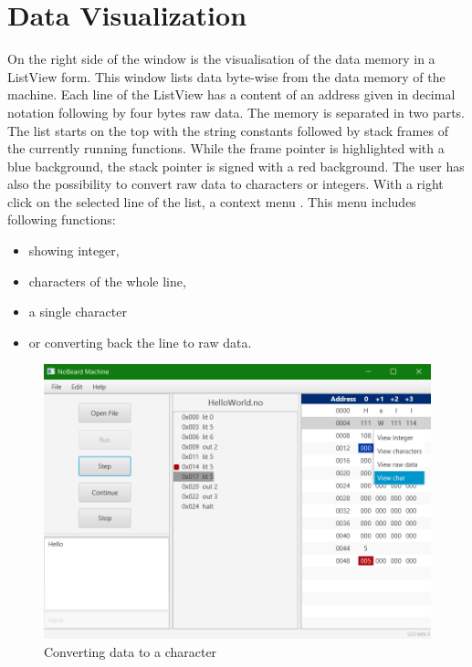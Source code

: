 \section{Data Visualization}
On the right side of the window is the visualisation of the data memory in a ListView form. This window lists data byte-wise from the data memory of the machine. Each line of the ListView has a content of an address given in decimal notation  following by four bytes  raw data. The memory is separated in two parts. The list starts on the top with the string constants followed by stack frames of the currently running functions. While the frame pointer is highlighted with a blue background, the stack pointer is signed with a red background. The user has also the possibility to convert raw data to characters or integers.
With a right click on the selected line of the list, a context menu . This menu includes following functions:
\begin{itemize}
\item showing integer,
\item characters of the whole line, 
\item a single character 
\item or converting back the line to raw data. 
\end{itemize}
\begin{figure}[h] 
	\centering
	\includegraphics[scale=.60]{images/screenshot-3.png}
	\caption{Converting data to a character}
	\label{fig:convertToChar}
\end{figure}
